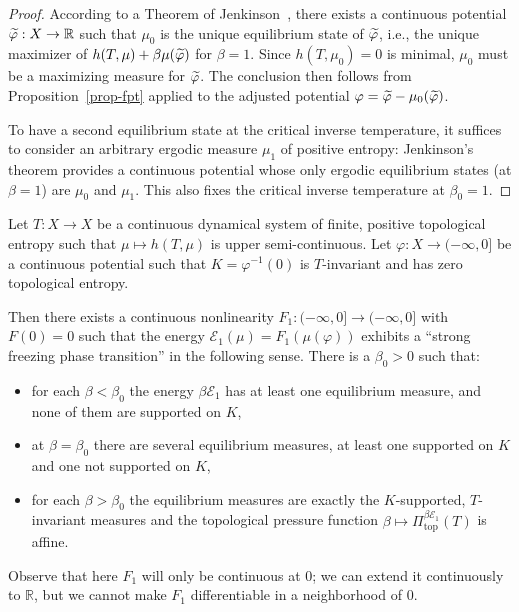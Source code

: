 \documentclass[AHL, Unicode, longabstracts,published]{cedram}
\theoremstyle{plain}
\theoremstyle{plain}
\newcommand\NLP{\Pi}
\renewcommand\top{{\mathrm{top}}}
\newcommand{\pot}{\varphi}
\newcommand*\8{\infty}
\newcommand\RR{\mathbb{R}}
\newcommand{\En}{\mathcal{E}}
\let\oldtilde\tilde
\renewcommand*{\tilde}[1]{\mathchoice{\widetilde{#1}}{\widetilde{#1}}{\oldtilde{#1}}{\oldtilde{#1}}}
\begin{document}
\begin{proof}
According to a Theorem of Jenkinson~\cite{Jenkinson}, there exists a continuous potential $\tilde\pot:X\to\RR$ such that $\mu_0$ is the unique equilibrium state of $\tilde\pot$, i.e., the unique maximizer of $h(T,\mu)+\beta\mu(\tilde\pot)$ for $\beta=1$. Since $h(T,\mu_0)=0$ is minimal, $\mu_0$ must be a maximizing measure for $\tilde\pot$. The conclusion then follows from Proposition~\ref{prop-fpt} applied to the adjusted potential $\pot=\tilde\pot-\mu_0(\tilde\pot)$.

To have a second equilibrium state at the critical inverse temperature, it suffices to consider an arbitrary ergodic measure $\mu_1$ of positive entropy: Jenkinson's theorem provides a continuous potential whose only ergodic equilibrium states (at $\beta=1$) are $\mu_0$ and $\mu_1$. This also fixes the critical inverse temperature at $\beta_0=1$.
\end{proof}

\begin{theo}\label{thm-fpt-nonlinear}
Let $T:X\to X$ be a continuous dynamical system of finite, positive topological entropy such that $\mu\mapsto h(T,\mu)$ is upper semi-continuous. Let $\pot:X\to(-\infty,0]$ be a continuous potential such that $K=\pot^{-1}(0)$ is $T$-invariant and has zero topological entropy.

Then there exists a continuous nonlinearity $F_1 : (-\infty,0]\to (-\infty,0]$ with $F(0)=0$ such that the energy $\En_1(\mu) = F_1(\mu(\pot))$ exhibits a ``strong freezing phase transition'' in the following sense. There is a $\beta_0>0$ such that:
\begin{itemize}
\item for each $\beta<\beta_0$ the energy $\beta \En_1$ has at least one equilibrium measure, and none of them are supported on $K$,
\item at $\beta=\beta_0$ there are several equilibrium measures, at least one supported on $K$ and one not supported on $K$,
\item for each $\beta>\beta_0$ the equilibrium measures are exactly the $K$-supported, $T$-invariant measures and the topological pressure function $\beta\mapsto \NLP^{\beta\En_1}_\top(T)$ is affine.
\end{itemize}
\end{theo}

Observe that here $F_1$ will only be continuous at $0$; we can extend it continuously to $\RR$, but we cannot make $F_1$ differentiable in a neighborhood of $0$.
\end{document}
